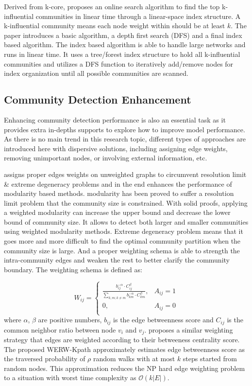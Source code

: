 Derived from k-core, \cite{li2015influential} proposes an online search algorithm to find the top k-influential communities in linear time through a linear-space index structure. A k-influential community means each node weight within should be at least $k$. The paper introduces a basic algorithm, a depth first search (DFS) and a final index based algorithm. The index based algorithm is able to handle large networks and runs in linear time. It uses a tree/forest index structure to hold all k-influential communities and utilizes a DFS function to iteratively add/remove nodes for index organization until all possible communities are scanned. 

\subsection{Community Detection Enhancement}

Enhancing community detection performance is also an essential task as it provides extra in-depths supports to explore how to improve model performance. As there is no main trend in this research topic, different types of approaches are introduced here with dispersive solutions, including assigning edge weights, removing unimportant nodes, or involving external information, etc. 

\cite{khadivi2011network} assigns proper edges weights on unweighted graphs to circumvent resolution limit \& extreme degeneracy problems and in the end enhances the performance of modularity based methods. modularity has been proved to suffer a resolution limit problem that the community size is constrained. With solid proofs, applying a weighted modularity can increase the upper bound and decrease the lower bound of community size. It allows to detect both larger and smaller communities using weighted modularity methods. Extreme degeneracy problem means that it goes more and more difficult to find the optimal community partition when the community size is large. And a proper weighting schema is able to strength the intra-community edges and weaken the rest to better clarify the community boundary. The weighting schema is defined as:

\begin{equation}
	W_{ij} = 
	\begin{cases}
	\frac{b_{ij}^{-\alpha}\cdot C_{ij}^{\beta}}{\sum_{k,m;k\neq m}b_{km}^{-\alpha}\cdot C_{km}^{\beta}},       & A_{ij} = 1\\ 
	0,  & A_{ij} = 0\\ 
	\end{cases}
\end{equation}
where $\alpha$, $\beta$ are positive numbers, $b_{ij}$ is the edge betweenness score and $C_{ij}$ is the common neighbor ratio between node $v_{i}$ and $v_j$.  \cite{de2013enhancing} proposes a similar weighting strategy that edges are weighted according to their betweeness centrality score. The proposed WERW-Kpath approximately estimates edge betweenness  score as the traversed probability of $\rho$ random walks with at most $k$ steps started from random nodes. This approximation reduces the NP hard edge weighting problem to a situation with worst time complexity as $\mathcal{O}(k|E|)$.

